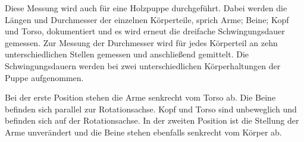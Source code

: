 Diese Messung wird auch für eine Holzpuppe durchgeführt. Dabei werden die Längen und Durchmesser der einzelnen Körperteile, sprich Arme; Beine; Kopf und Torso, dokumentiert und es wird erneut die dreifache Schwingungsdauer
gemessen. Zur Messung der Durchmesser wird für jedes Körperteil an zehn unterschiedlichen Stellen gemessen und anschließend gemittelt. Die Schwingungsdauern werden bei zwei unterschiedlichen Körperhaltungen der Puppe aufgenommen.

Bei der erste Position stehen die Arme senkrecht vom Torso ab. Die Beine befinden sich parallel zur Rotationsachse. Kopf und Torso sind unbeweglich und befinden sich auf der Rotationsachse.
In der zweiten Position ist die Stellung der Arme unverändert und die Beine stehen ebenfalls senkrecht vom Körper ab. 